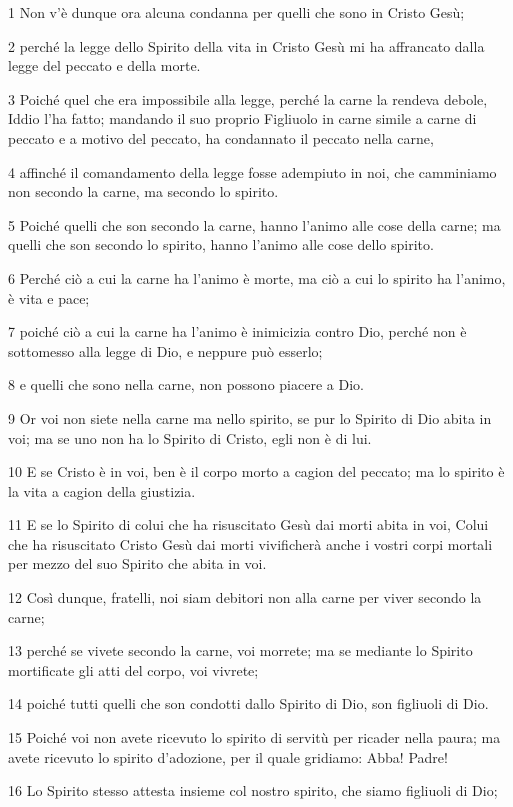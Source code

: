 \par 1 Non v'è dunque ora alcuna condanna per quelli che sono in Cristo Gesù;
\par 2 perché la legge dello Spirito della vita in Cristo Gesù mi ha affrancato dalla legge del peccato e della morte.
\par 3 Poiché quel che era impossibile alla legge, perché la carne la rendeva debole, Iddio l'ha fatto; mandando il suo proprio Figliuolo in carne simile a carne di peccato e a motivo del peccato, ha condannato il peccato nella carne,
\par 4 affinché il comandamento della legge fosse adempiuto in noi, che camminiamo non secondo la carne, ma secondo lo spirito.
\par 5 Poiché quelli che son secondo la carne, hanno l'animo alle cose della carne; ma quelli che son secondo lo spirito, hanno l'animo alle cose dello spirito.
\par 6 Perché ciò a cui la carne ha l'animo è morte, ma ciò a cui lo spirito ha l'animo, è vita e pace;
\par 7 poiché ciò a cui la carne ha l'animo è inimicizia contro Dio, perché non è sottomesso alla legge di Dio, e neppure può esserlo;
\par 8 e quelli che sono nella carne, non possono piacere a Dio.
\par 9 Or voi non siete nella carne ma nello spirito, se pur lo Spirito di Dio abita in voi; ma se uno non ha lo Spirito di Cristo, egli non è di lui.
\par 10 E se Cristo è in voi, ben è il corpo morto a cagion del peccato; ma lo spirito è la vita a cagion della giustizia.
\par 11 E se lo Spirito di colui che ha risuscitato Gesù dai morti abita in voi, Colui che ha risuscitato Cristo Gesù dai morti vivificherà anche i vostri corpi mortali per mezzo del suo Spirito che abita in voi.
\par 12 Così dunque, fratelli, noi siam debitori non alla carne per viver secondo la carne;
\par 13 perché se vivete secondo la carne, voi morrete; ma se mediante lo Spirito mortificate gli atti del corpo, voi vivrete;
\par 14 poiché tutti quelli che son condotti dallo Spirito di Dio, son figliuoli di Dio.
\par 15 Poiché voi non avete ricevuto lo spirito di servitù per ricader nella paura; ma avete ricevuto lo spirito d'adozione, per il quale gridiamo: Abba! Padre!
\par 16 Lo Spirito stesso attesta insieme col nostro spirito, che siamo figliuoli di Dio;
